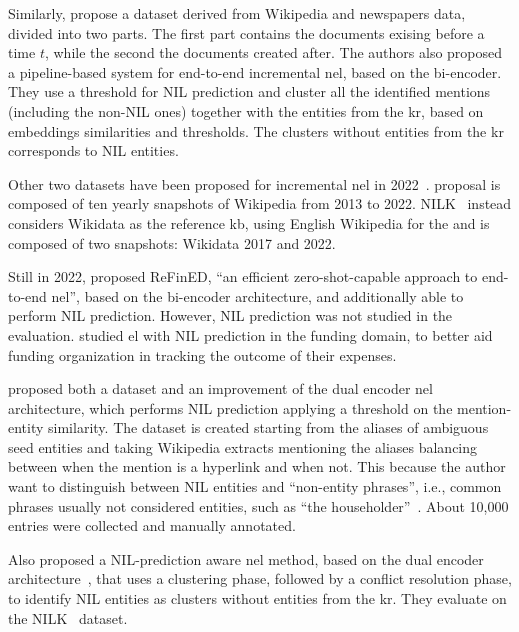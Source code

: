Similarly, \textcite{kassner-etal-2022-edin} propose a dataset derived from Wikipedia and newspapers data, divided into two parts. The first part contains the documents exising before a time $t$, while the second the documents created after. The authors also proposed a pipeline-based system for end-to-end incremental \acl{nel}, based on the bi-encoder. They use a threshold for NIL prediction and cluster all the identified mentions (including the non-NIL ones) together with the entities from the \ac{kr}, based on embeddings similarities and thresholds. The clusters without entities from the \ac{kr} corresponds to NIL entities.

Other two datasets have been proposed for incremental \ac{nel} in 2022~\cite{tempel_2022,nilk_dataset_2022}.
\textcite{tempel_2022} proposal is composed of ten yearly snapshots of Wikipedia from 2013 to 2022. NILK~\cite{nilk_dataset_2022} instead considers Wikidata as the reference \ac{kb}, using English Wikipedia for the and is composed of two snapshots: Wikidata 2017 and 2022.

Still in 2022, \textcite{ayoola-etal-2022-refined} proposed ReFinED, ``an efficient zero-shot-capable approach to end-to-end \ac{nel}'', based on the bi-encoder architecture, and additionally able to perform NIL prediction. However, NIL prediction was not studied in the evaluation.
\textcite{aydin-etal-2022-find} studied \ac{el} with NIL prediction in the funding domain, to better aid funding organization in tracking the outcome of their expenses.

\textcite{zhu-etal-2023-learn} proposed both a dataset and an improvement of the dual encoder \ac{nel} architecture, which performs NIL prediction applying a threshold on the mention-entity similarity. The dataset is created starting from the aliases of ambiguous seed entities and taking Wikipedia extracts mentioning the aliases balancing between when the mention is a hyperlink and when not. This because the author want to distinguish between NIL entities and ``non-entity phrases'', i.e., common phrases usually not considered entities, such as ``the householder''~\cite{zhu-etal-2023-learn}. About 10,000 entries were collected and manually annotated.

Also \textcite{Heist2023nastylinker} proposed a NIL-prediction aware \ac{nel} method, based on the dual encoder architecture~\cite{blink}, that uses a clustering phase, followed by a conflict resolution phase, to identify NIL entities as clusters without entities from the \ac{kr}. They evaluate on the NILK~\cite{nilk_dataset_2022} dataset.

